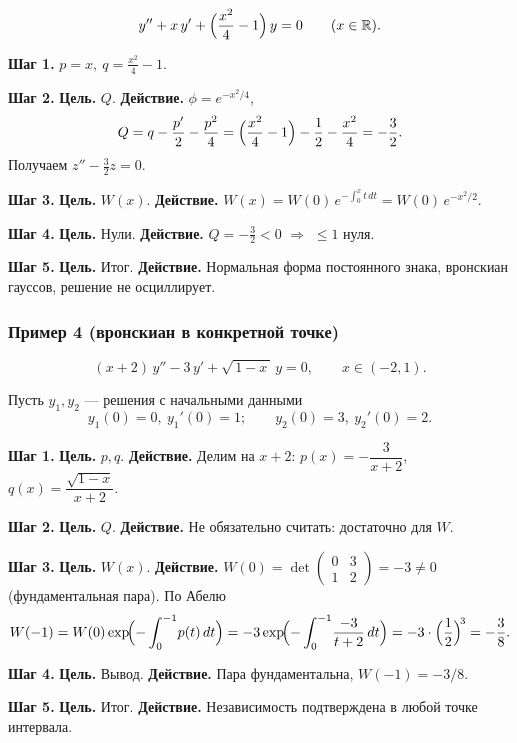 \[
y''+x\,y'+\Bigl(\frac{x^2}{4}-1\Bigr)\,y=0\qquad (x\in\mathbb R).
\]

\textbf{Шаг 1.} $p=x,\ q=\tfrac{x^2}{4}-1$.

\textbf{Шаг 2.} \textbf{Цель.} $Q$. \textbf{Действие.} $\phi=e^{-x^2/4}$,
\[
Q=q-\frac{p'}{2}-\frac{p^2}{4}
=\Bigl(\frac{x^2}{4}-1\Bigr)-\frac12-\frac{x^2}{4}=-\frac{3}{2}.
\]
Получаем $z''-\tfrac32 z=0$.

\textbf{Шаг 3.} \textbf{Цель.} $W(x)$. \textbf{Действие.} $W(x)=W(0)\,e^{-\int_0^x t\,dt}=W(0)\,e^{-x^2/2}$.

\textbf{Шаг 4.} \textbf{Цель.} Нули. \textbf{Действие.} $Q=-\tfrac32<0$ $\Rightarrow$ $\le1$ нуля.

\textbf{Шаг 5.} \textbf{Цель.} Итог. \textbf{Действие.} Нормальная форма постоянного знака, вронскиан гауссов, решение не осциллирует.

\subsubsection{Пример 4 (вронскиан в конкретной точке)}

\[
(x+2)\,y''-3\,y'+\sqrt{\,1-x\,}\,y=0,\qquad x\in(-2,1).
\]

Пусть $y_1,y_2$ — решения с начальными данными
\[
y_1(0)=0,\ y_1'(0)=1;\qquad y_2(0)=3,\ y_2'(0)=2.
\]

\textbf{Шаг 1.} \textbf{Цель.} $p,q$. \textbf{Действие.} Делим на $x+2$: $p(x)=-\dfrac{3}{x+2}$, $q(x)=\dfrac{\sqrt{1-x}}{x+2}$.

\textbf{Шаг 2.} \textbf{Цель.} $Q$. \textbf{Действие.} Не обязательно считать: достаточно для $W$.

\textbf{Шаг 3.} \textbf{Цель.} $W(x)$. \textbf{Действие.} $W(0)=\det\begin{pmatrix}0&3\\1&2\end{pmatrix}=-3\neq0$ (фундаментальная пара).
По Абелю
\[
W(-1)=W(0)\exp\!\Bigl(-\int_0^{-1}\!p(t)\,dt\Bigr)
= -3\exp\!\Bigl(-\int_0^{-1}\!\frac{-3}{t+2}\,dt\Bigr)
= -3\cdot\Bigl(\frac{1}{2}\Bigr)^{\!3}=-\frac{3}{8}.
\]

\textbf{Шаг 4.} \textbf{Цель.} Вывод. \textbf{Действие.} Пара фундаментальна, $W(-1)=-3/8$.

\textbf{Шаг 5.} \textbf{Цель.} Итог. \textbf{Действие.} Независимость подтверждена в любой точке интервала.
